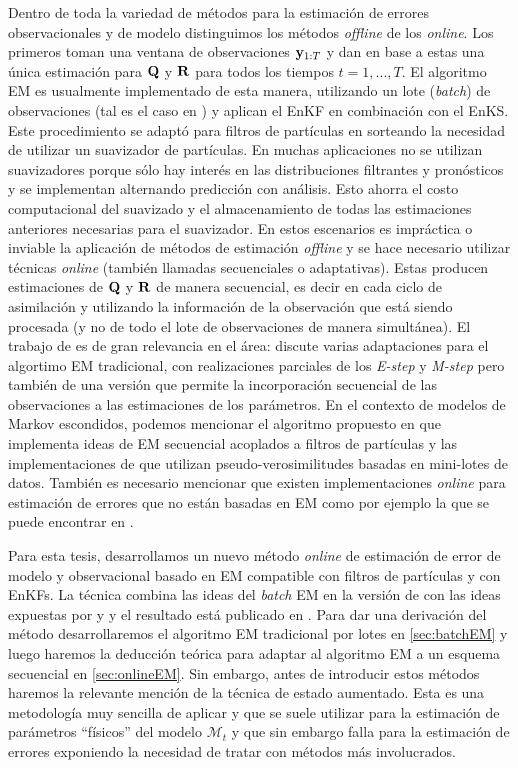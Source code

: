 Dentro de toda la variedad de métodos para la estimación de errores observacionales y de modelo distinguimos los métodos \textit{offline} de los \textit{online}. Los primeros toman una ventana de observaciones $\mathbf{y}_{1:T}$ y dan en base a estas una única estimación para $\mathbf{Q}$ y $\mathbf{R}$ para todos los tiempos $t = 1, ..., T$. El algoritmo EM es usualmente implementado de esta manera, utilizando un lote (\textit{batch}) de observaciones (tal es el caso en \cite{Dreano2017, Tandeo2015, Pulido2018}) y aplican el EnKF en combinación con el EnKS. Este procedimiento se adaptó para filtros de partículas en \cite{Lucini2021} sorteando la necesidad de utilizar un suavizador de partículas. En muchas aplicaciones no se utilizan suavizadores porque sólo hay interés en las distribuciones filtrantes y pronósticos y se implementan alternando predicción con análisis. Esto ahorra el costo computacional del suavizado y el almacenamiento de todas las estimaciones anteriores necesarias para el suavizador. En estos escenarios es impráctica o inviable la aplicación de métodos de estimación \textit{offline} y se hace necesario utilizar técnicas \textit{online} (también llamadas secuenciales o adaptativas). Estas producen estimaciones de $\mathbf{Q}$ y $\mathbf{R}$ de manera secuencial, es decir en cada ciclo de asimilación y utilizando la información de la observación que está siendo procesada (y no de todo el lote de observaciones de manera simultánea). El trabajo de \cite{Neal1998} es de gran relevancia en el área: discute varias adaptaciones para el algortimo EM tradicional, con realizaciones parciales de los \textit{E-step} y \textit{M-step} pero también de una versión que permite la incorporación secuencial de las observaciones a las estimaciones de los parámetros. En el contexto de modelos de Markov escondidos, podemos mencionar el algoritmo propuesto en \cite{Cappe2009} que implementa ideas de EM secuencial acoplados a filtros de partículas y las implementaciones de \cite{Andrieu2003} que utilizan pseudo-verosimilitudes basadas en mini-lotes de datos. También es necesario mencionar que existen implementaciones \textit{online} para estimación de errores que no están basadas en EM como por ejemplo la que se puede encontrar en \cite{Berry2013}.

Para esta tesis, desarrollamos un nuevo método \textit{online} de estimación de error de modelo y observacional basado en EM compatible con filtros de partículas y con EnKFs. La técnica combina las ideas del \textit{batch} EM en la versión de \cite{Dreano2017} con las ideas expuestas por \cite{Cappe2009} y \cite{Andrieu2003} y el resultado está publicado en \cite{Cocucci2021}. Para dar una derivación del método desarrollaremos el algoritmo EM tradicional por lotes en \ref{sec:batchEM} y luego haremos la deducción teórica para adaptar al algoritmo EM a un esquema secuencial en \ref{sec:onlineEM}. Sin embargo, antes de introducir estos métodos haremos la relevante mención de la técnica de estado aumentado. Esta es una metodología muy sencilla de aplicar y que se suele utilizar para la estimación de parámetros ``físicos'' del modelo $\mathcal{M}_t$ y que sin embargo falla para la estimación de errores exponiendo la necesidad de tratar con métodos más involucrados.

